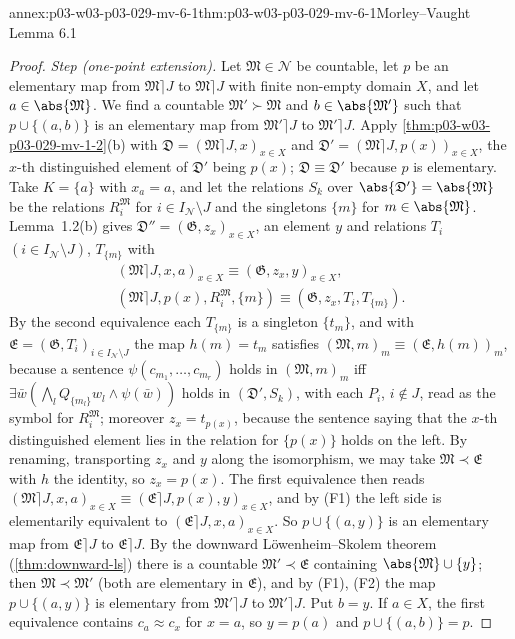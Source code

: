 \begin{annexitem}{annex:p03-w03-p03-029-mv-6-1}{thm:p03-w03-p03-029-mv-6-1}{Morley--Vaught Lemma 6.1}
\begin{proof}
\emph{Step (one-point extension).} Let \(\mathfrak M\in\mathscr N\) be
countable, let \(p\) be an elementary map from \(\mathfrak M\rceil J\) to
\(\mathfrak M\rceil J\) with finite non-empty domain \(X\), and let
\(a\in\abs{\mathfrak M}\). We find a countable \(\mathfrak M'\succ\mathfrak
M\) and \(b\in\abs{\mathfrak M'}\) such that \(p\cup\{(a,b)\}\) is an
elementary map from \(\mathfrak M'\rceil J\) to \(\mathfrak M'\rceil J\).
Apply \cref{thm:p03-w03-p03-029-mv-1-2}(b) with
\(\mathfrak D=(\mathfrak M\rceil J,x)_{x\in X}\) and \(\mathfrak
D'=(\mathfrak M\rceil J,p(x))_{x\in X}\), the \(x\)-th distinguished element
of \(\mathfrak D'\) being \(p(x)\); \(\mathfrak D\equiv\mathfrak D'\) because
\(p\) is elementary. Take \(K=\{a\}\) with \(x_a=a\), and let the
relations \(S_k\) over \(\abs{\mathfrak D'}=\abs{\mathfrak M}\) be the
relations \(R_i^{\mathfrak M}\) for \(i\in I_{\mathscr N}\setminus J\) and
the singletons \(\{m\}\) for \(m\in\abs{\mathfrak M}\). Lemma~1.2(b) gives
\(\mathfrak D''=(\mathfrak G,z_x)_{x\in X}\), an element \(y\) and relations
\(T_i\) \((i\in I_{\mathscr N}\setminus J)\), \(T_{\{m\}}\) with
\begin{gather*}
  (\mathfrak M\rceil J,x,a)_{x\in X}\equiv(\mathfrak G,z_x,y)_{x\in X},\\
  (\mathfrak M\rceil J,p(x),R_i^{\mathfrak M},\{m\})\equiv
  (\mathfrak G,z_x,T_i,T_{\{m\}}).
\end{gather*}
By the second equivalence each \(T_{\{m\}}\) is a singleton \(\{t_m\}\),
and with \(\mathfrak E=(\mathfrak G,T_i)_{i\in I_{\mathscr N}\setminus J}\)
the map \(h(m)=t_m\) satisfies \((\mathfrak M,m)_{m}\equiv(\mathfrak
E,h(m))_{m}\), because a sentence \(\psi(c_{m_1},\ldots,c_{m_r})\) holds in
\((\mathfrak M,m)_m\) iff \(\exists\bar w(\bigwedge_lQ_{\{m_l\}}w_l\wedge
\psi(\bar w))\) holds in \((\mathfrak D',S_k)\), with each \(P_i\),
\(i\notin J\), read as the symbol for \(R_i^{\mathfrak M}\); moreover \(z_x=t_{p(x)}\), because the sentence saying that
the \(x\)-th distinguished element lies in the relation for \(\{p(x)\}\) holds
on the left. By renaming, transporting \(z_x\) and \(y\) along the isomorphism, we may
take \(\mathfrak M\prec\mathfrak E\) with \(h\) the identity, so
\(z_x=p(x)\). The first equivalence then reads
\((\mathfrak M\rceil J,x,a)_{x\in X}\equiv(\mathfrak E\rceil
J,p(x),y)_{x\in X}\), and by (F1) the left side is elementarily equivalent to
\((\mathfrak E\rceil J,x,a)_{x\in X}\). So \(p\cup\{(a,y)\}\) is an elementary
map from \(\mathfrak E\rceil J\) to \(\mathfrak E\rceil J\). By the downward
L\"owenheim--Skolem theorem (\cref{thm:downward-ls}) there is a countable
\(\mathfrak M'\prec\mathfrak E\) containing \(\abs{\mathfrak M}\cup\{y\}\);
then \(\mathfrak M\prec\mathfrak M'\) (both are elementary in
\(\mathfrak E\)), and by (F1), (F2) the map \(p\cup\{(a,y)\}\) is elementary
from \(\mathfrak M'\rceil J\) to \(\mathfrak M'\rceil J\). Put \(b=y\). If
\(a\in X\), the first equivalence contains \(c_a\approx c_x\) for \(x=a\), so
\(y=p(a)\) and \(p\cup\{(a,b)\}=p\).


\end{proof}
\end{annexitem}
